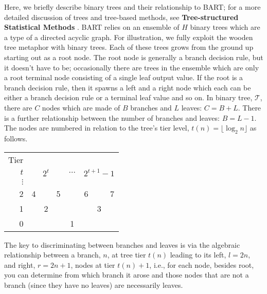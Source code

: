 \documentclass[cmbright,doublespace]{WileySTAT-V1}
\theoremstyle{plain}
\begin{document}
Here, we briefly describe binary trees and their relationship to BART;
for a more detailed discussion of trees and tree-based methods, see
\textbf{Tree-structured Statistical Methods} \citep{ZhanCrow14}.  BART
relies on an ensemble of $H$ binary trees which are a type of a
directed acyclic graph.  For illustration, we fully exploit
the wooden tree metaphor with binary trees.  Each of these trees grows
from the ground up starting out as a root node.  The root node is
generally a branch decision rule, but it doesn't have to be;
occasionally there are trees in the ensemble which are only a root
terminal node consisting of a single leaf output value.  If the root
is a branch decision rule, then it spawns a left and a right node
which each can be either a branch decision rule or a terminal leaf
value and so on.  In binary tree, $\mathcal{T}$, there are $C$ nodes
which are made of $B$ branches and $L$ leaves: $C=B+L$.  There is a
further relationship between the number of branches and leaves:
$B= L-1$.  The nodes are numbered in relation to the tree's tier
level, $t(n)=\lfloor \log_2 n \rfloor$ as follows.
\begin{table}[!h]\label{tree-schematic}
\begin{center}
\begin{tabular}{r|ccccccc} \hline
Tier & \\ %
$t$ & \multicolumn{3}{c}{$2^t$} & $\dots$ &
\multicolumn{3}{c}{$2^{t+1}\!-\!1$} \\ 
$\vdots$ & \\
2 & 4 &   & 5 &   & 6 &   & 7 \\
1 &   & 2 &   &   &   & 3 &   \\
0 &   &   &   & 1 &   &   &   \\ \hline
\end{tabular}
\end{center}
\end{table}

The key to discriminating between branches and leaves is via the
algebraic relationship between a branch, $n$, at tree tier $t(n)$
leading to its left, $l=2n$, and right, $r=2n+1$, nodes at tier
$t(n)+1$, i.e., for each node, besides root,
you can determine from which branch it arose and those nodes that are
not a branch (since they have no leaves) are necessarily leaves.
\end{document}
